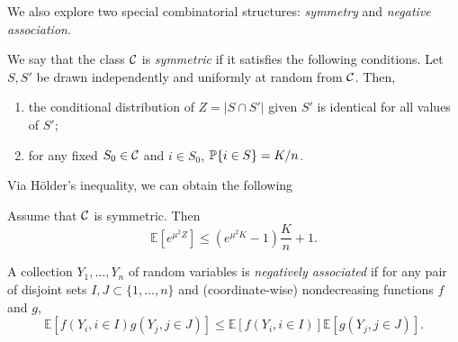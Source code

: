 \documentclass[10pt, oneside]{article}
\begin{document}
We also explore two special combinatorial structures: \textit{symmetry} and \textit{negative association}.
\begin{defn}[Symmetry]
  \label{defn:symmetry}
  We say that the class ${\mathcal C}$ is {\it symmetric} if it satisfies the following conditions.
  Let $S,S'$ be drawn independently and uniformly at random from ${\mathcal C}$. Then,
  \begin{enumerate}
    \item the conditional distribution of $Z=|S\cap S'|$ given $S'$ is identical
    for all values of $S'$;
    \item for any fixed $S_0\in{\mathcal C}$ and $i\in S_0$, $\mathbb{P}\{i\in S\}=K/n$.
  \end{enumerate}
\end{defn}
Via H\"older's inequality, we can obtain the following
\begin{prop}
  \label{prop:symmetric}
  Assume that ${\mathcal C}$ is symmetric. Then 
  $$\mathbb{E}[ e^{\mu^2 Z}]\le (e^{\mu^2K} -1 ) \frac{K}{n} +1.$$
\end{prop}
\begin{defn}
  A collection $Y_1,\ldots,Y_n$ of random variables is \textit{negatively associated} if for any pair of disjoint sets $I,J\subset\{1,\ldots,n\}$ and (coordinate-wise) nondecreasing functions $f$ and $g$,
\[
\mathbb{E}[ f(Y_i, i\in I) g(Y_j, j\in J) ]
\le\mathbb{E}[ f(Y_i, i\in I) ] \mathbb{E}[g(Y_j, j\in J) ].
\]
\end{defn}
\end{document}
